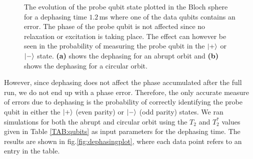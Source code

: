\begin{figure}[H]
	\caption[oddeven]{The evolution of the probe qubit state plotted in the Bloch sphere for a dephasing time $1.2\, $ms where one of the data qubits contains an error. The phase of the probe qubit is not affected since no relaxation or excitation is taking place. The effect can however be seen in the probability of measuring the probe qubit in the $\ket{+}$ or $\ket{-}$ state. \textbf{(a)} shows the dephasing for an abrupt orbit and \textbf{(b)} shows the dephasing for a circular orbit.}
	\label{FIG:deph}
\end{figure}


However, since dephasing does not affect the phase accumulated after the full run, we do not end up with a phase error. Therefore, the only accurate measure of errors due to dephasing is the probability of correctly identifying the probe qubit in either the $\ket{+}$ (even parity) or $\ket{-}$ (odd parity) states. We ran simulations for both the abrupt and circular orbit using the $T_2$ and $T_2^*$ values given in Table \ref{TAB:qubits} as input parameters for the dephasing time. The results are shown in fig.\@ \ref{fig:dephasingplot}, where each data point refers to an entry in the table. 

